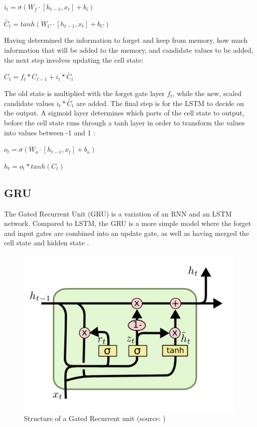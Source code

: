 \indent\newline 
$i_{t} = \sigma(W_{f} \cdot[h_{t-1},x_{t}] + b_{i})$

\indent\newline 
$\tilde{C_{t}} = tanh(W_{C} \cdot[h_{t-1},x_{t}] + b_{C})$

\indent\newline 
Having determined the information to forget and keep from memory, how much information that will be added to the memory, and candidate values to be added, the next step involves updating the cell state:

\indent\newline 
$C_{t} = f_{t} \ast C_{t-1} + i_{t} \ast \tilde{C_{t}}$

\indent\newline 
The old state is multiplied with the forget gate layer $f_{t}$, while the new, scaled candidate values $i_{t}*\tilde{C_{t}}$ are added. The final step is for the LSTM to decide on the output. A sigmoid layer determines which parts of the cell state to output, before the cell state runs through a tanh layer in order to transform the values into values between -1 and 1 \cite{olah}: 

\indent\newline 
$o_{t} = \sigma(W_{o} \cdot[h_{t-1},x_{t}] + b_{o})$

\indent\newline 
$h_{t} = o_{t} * tanh(C_{t})$

\subsection{GRU}
The Gated Recurrent Unit (GRU) is a variation of an RNN and an LSTM network. Compared to LSTM, the GRU is a more simple model where the forget and input gates are combined into an update gate, as well as having merged the cell state and hidden state \cite{olah}. 

\indent\newline 
\begin{figure}[H]
\centering
\includegraphics [scale=0.40,angle=360]{figures/gru.png}
\caption{Structure of a Gated Recurrent unit (source: \cite{olah})}
\label{fig:gru}
\end{figure}


